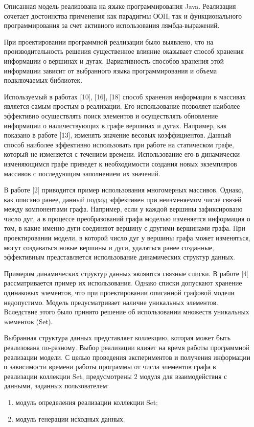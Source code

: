 Описанная модель реализована на языке программирования Java. Реализация сочетает достоинства применения как парадигмы ООП, так и функционального программирования за счет активного использования лямбда-выражений.

При проектировании программной реализации было выявлено, что на производительность решения существенное влияние оказывает способ хранения информации о вершинах и дугах. Вариативность способов хранения этой информации зависит от выбранного языка программирования и объема подключаемых библиотек.

Используемый в работах [10], [16], [18] способ хранения информации в массивах является самым простым в реализации. Его использование позволяет наиболее эффективно осуществлять поиск элементов и осуществлять обновление информации о наличествующих в графе вершинах и дугах. Например, как показано в работе [13], изменять значение весовых коэффициентов. Данный способ наиболее эффективно использовать при работе на статическом графе, который не изменяется с течением времени. Использование его в динамически изменяющимся графе приведет к необходимости создания новых экземпляров массивов с последующим заполнением их значений.

В работе [2] приводится пример использования многомерных массивов. Однако, как описано ранее, данный подход эффективен при неизменяемом числе связей между компонентами графа. Например, если у каждой вершины зафиксировано число дуг, а в процессе преобразований графа моделью изменяется информация о том, в какие именно дуги соединяют вершину с другими вершинами графа. При проектировании модели, в которой число дуг у вершины графа может изменяться, могут создаваться новые вершины и дуги, удаляться ранее созданные, эффективным представляется использование динамических структур данных.

Примером динамических структур данных являются связные списки. В работе [4] рассматривается пример их использования. Однако списки допускают хранение одинаковых элементов, что при проектировании описанной графовой модели недопустимо. Модель предусматривает наличие уникальных элементов. Вследствие этого было принято решение об использовании множеств уникальных элементов (Set).

Выбранная структура данных представляет коллекцию, которая может быть реализована по-разному. Выбор реализации влияет на время работы программной реализации модели. С целью проведения экспериментов и получения информации о зависимости времени работы программы от числа элементов графа в реализации коллекции Set, предусмотрены 2 модуля для взаимодействия с данными, заданных пользователем:
\begin{enumerate}
    \item модуль определения реализации коллекции Set;
    \item модуль генерации исходных данных.
\end{enumerate}

